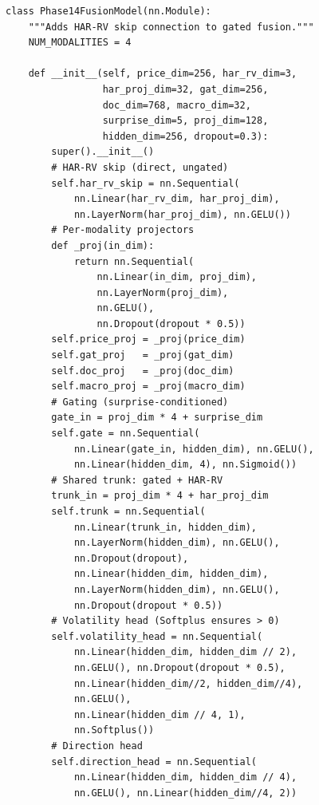 \begin{lstlisting}[caption={Phase 14 Fusion Model with HAR-RV skip (src/models/fusion\_model.py)}]
class Phase14FusionModel(nn.Module):
    """Adds HAR-RV skip connection to gated fusion."""
    NUM_MODALITIES = 4

    def __init__(self, price_dim=256, har_rv_dim=3,
                 har_proj_dim=32, gat_dim=256,
                 doc_dim=768, macro_dim=32,
                 surprise_dim=5, proj_dim=128,
                 hidden_dim=256, dropout=0.3):
        super().__init__()
        # HAR-RV skip (direct, ungated)
        self.har_rv_skip = nn.Sequential(
            nn.Linear(har_rv_dim, har_proj_dim),
            nn.LayerNorm(har_proj_dim), nn.GELU())
        # Per-modality projectors
        def _proj(in_dim):
            return nn.Sequential(
                nn.Linear(in_dim, proj_dim),
                nn.LayerNorm(proj_dim),
                nn.GELU(),
                nn.Dropout(dropout * 0.5))
        self.price_proj = _proj(price_dim)
        self.gat_proj   = _proj(gat_dim)
        self.doc_proj   = _proj(doc_dim)
        self.macro_proj = _proj(macro_dim)
        # Gating (surprise-conditioned)
        gate_in = proj_dim * 4 + surprise_dim
        self.gate = nn.Sequential(
            nn.Linear(gate_in, hidden_dim), nn.GELU(),
            nn.Linear(hidden_dim, 4), nn.Sigmoid())
        # Shared trunk: gated + HAR-RV
        trunk_in = proj_dim * 4 + har_proj_dim
        self.trunk = nn.Sequential(
            nn.Linear(trunk_in, hidden_dim),
            nn.LayerNorm(hidden_dim), nn.GELU(),
            nn.Dropout(dropout),
            nn.Linear(hidden_dim, hidden_dim),
            nn.LayerNorm(hidden_dim), nn.GELU(),
            nn.Dropout(dropout * 0.5))
        # Volatility head (Softplus ensures > 0)
        self.volatility_head = nn.Sequential(
            nn.Linear(hidden_dim, hidden_dim // 2),
            nn.GELU(), nn.Dropout(dropout * 0.5),
            nn.Linear(hidden_dim//2, hidden_dim//4),
            nn.GELU(),
            nn.Linear(hidden_dim // 4, 1),
            nn.Softplus())
        # Direction head
        self.direction_head = nn.Sequential(
            nn.Linear(hidden_dim, hidden_dim // 4),
            nn.GELU(), nn.Linear(hidden_dim//4, 2))
\end{lstlisting}

